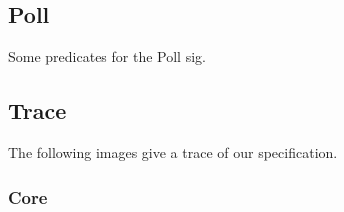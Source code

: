		
		
	\subsection{Poll}
		Some predicates for the Poll sig.
		
		
		
\subsection{Trace}
	The following images give a trace of our specification.
	
	\subsubsection{Core}
